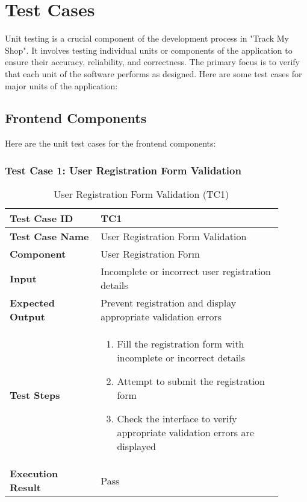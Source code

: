 \section{Test Cases}
Unit testing is a crucial component of the development process in "Track My Shop". It involves testing individual units or components of the application to ensure their accuracy, reliability, and correctness. The primary focus is to verify that each unit of the software performs as designed. Here are some test cases for major units of the application:

\pagebreak
\subsection{Frontend Components}

Here are the unit test cases for the frontend components:


\begin{table}[h]
	\subsubsection{Test Case 1: User Registration Form Validation}
	\centering
	\caption{User Registration Form Validation (TC1)}
	\begin{tabular}{|p{0.3\linewidth}|p{0.6\linewidth}|}
		\hline
		\textbf{Test Case ID} & TC1 \\
		\hline
		\textbf{Test Case Name} & User Registration Form Validation \\
		\hline
		\textbf{Component} & User Registration Form \\
		\hline
		\textbf{Input} & Incomplete or incorrect user registration details \\
		\hline
		\textbf{Expected Output} & Prevent registration and display appropriate validation errors \\
		\hline
		\textbf{Test Steps} & 
		\begin{enumerate}
			\item Fill the registration form with incomplete or incorrect details
			\item Attempt to submit the registration form
			\item Check the interface to verify appropriate validation errors are displayed
		\end{enumerate} \\
		\hline
		\textbf{Execution Result} & Pass \\
		\hline
	\end{tabular}
\end{table}

